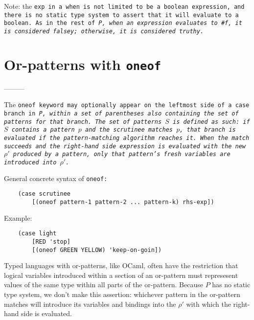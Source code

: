 \documentclass[]{article}
\begin{document}
Note: the \tt{exp} in a \tt{when} is not limited to be a boolean expression, 
and there is no static type system to assert that it will evaluate to a boolean.
As in the rest of \it{P}, when an expression evaluates to \tt{\#f}, it
is considered falsey; otherwise, it is considered truthy. 

\medskip


\section{Or-patterns with \tt{oneof}}

\medskip

---------


The \tt{oneof} keyword may optionally appear on the leftmost side of a \tt{case}
branch in \it{P}, within a set of parentheses also containing the set of 
patterns for that branch. The set of patterns $S$ is defined as such: if $S$ 
contains a pattern $p$ and the scrutinee matches $p$, that branch is evaluated
if the pattern-matching algorithm reaches it. 
When the match succeeds and the right-hand
side expression is evaluated with the new $\rho'$ produced by a pattern, only 
that pattern's fresh variables are introduced into $\rho'$. 

\medskip

General concrete syntax of \tt{oneof}: 


\begin{verbatim}
    (case scrutinee
        [(oneof pattern-1 pattern-2 ... pattern-k) rhs-exp])
\end{verbatim}


Example: 
\begin{verbatim}
    (case light
        [RED 'stop]
        [(oneof GREEN YELLOW) 'keep-on-goin])
\end{verbatim}



\medskip

Typed languages with or-patterns, like OCaml, often have the restriction that
logical variables introduced within a section of an or-pattern must represesent
values of the same type within all parts of the or-pattern. Because $P$ has no
static type system, we don't make this assertion: whichever pattern in the
or-pattern matches will introduce its variables and bindings into the $\rho'$
with which the right-hand side is evaluated. 
\end{document}
